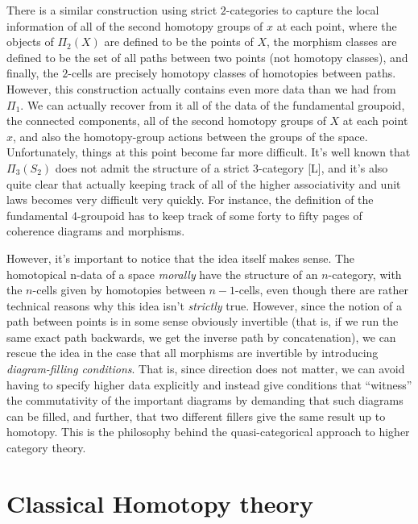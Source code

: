 \documentclass{amsart}
\begin{document}
There is a similar construction using strict $2$-categories to capture the local information of all of the second homotopy groups of $x$ at each point, where the objects of $\Pi_2(X)$ are defined to be the points of $X$, the morphism classes are defined to be the set of all paths between two points (not homotopy classes), and finally, the $2$-cells are precisely homotopy classes of homotopies between paths.  However, this construction actually contains even more data than we had from $\Pi_1$.  We can actually recover from it all of the data of the fundamental groupoid, the connected components, all of the second homotopy groups of $X$ at each point $x$, and also the homotopy-group actions between the groups of the space.  Unfortunately, things at this point become far more difficult.  It's well known that $\Pi_3(S_2)$  does not admit the structure of a strict $3$-category [L], and it's also quite clear that actually keeping track of all of the higher associativity and unit laws becomes very difficult very quickly.   For instance, the definition of the fundamental 4-groupoid has to keep track of some forty to fifty pages of coherence diagrams and morphisms.    

However, it's important to notice that the idea itself makes sense.  The homotopical n-data of a space \emph{morally} have the structure of an $n$-category, with the $n$-cells given by homotopies between $n-1$-cells, even though there are rather technical reasons why this idea isn't \emph{strictly} true.  However, since the notion of a path between points is in some sense obviously invertible (that is, if we run the same exact path backwards, we get the inverse path by concatenation), we can rescue the idea in the case that all morphisms are invertible by introducing \emph{diagram-filling conditions}.  That is, since direction does not matter, we can avoid having to specify higher data explicitly and instead give conditions that ``witness'' the commutativity of the important diagrams by demanding that such diagrams can be filled, and further, that two different fillers give the same result up to homotopy.  This is the philosophy behind the quasi-categorical approach to higher category theory.  

\section{Classical Homotopy theory}
\end{document}
